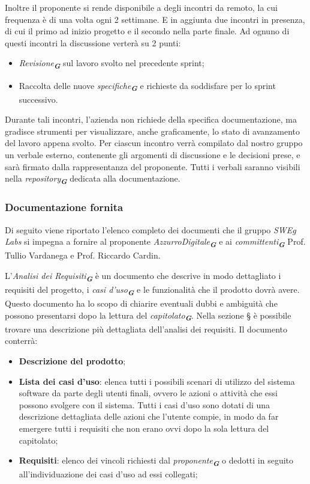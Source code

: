 Inoltre il proponente si rende disponibile a degli incontri da remoto, la cui frequenza è di una volta ogni 2 settimane.
E in aggiunta due incontri in presenza, di cui il primo ad inizio progetto e il secondo nella parte finale.
Ad ognuno di questi incontri la discussione verterà su 2 punti:
\begin{itemize}
    \item \emph{Revisione}\textsubscript{\textit{\textbf{G}}} sul lavoro svolto nel precedente sprint;
    \item Raccolta delle nuove \emph{specifiche}\textsubscript{\textit{\textbf{G}}} e richieste da soddisfare per lo sprint successivo.
\end{itemize}
Durante tali incontri, l’azienda non richiede della specifica documentazione, ma gradisce strumenti per visualizzare, anche graficamente, lo stato di avanzamento del lavoro appena svolto.
Per ciascun incontro verrà compilato dal nostro gruppo un verbale esterno, contenente gli argomenti di discussione e le decisioni prese, e sarà firmato dalla rappresentanza del proponente.
Tutti i verbali saranno visibili nella \emph{repository}\textsubscript{\textit{\textbf{G}}} dedicata alla documentazione.

\subsubsection{Documentazione fornita}
\label{sec:documentazione_fornita}
Di seguito viene riportato l'elenco completo dei documenti che il gruppo \emph{SWEg Labs} si impegna a fornire al proponente \emph{AzzurroDigitale}\textsubscript{\textit{\textbf{G}}}
e ai \emph{committenti}\textsubscript{\textit{\textbf{G}}} Prof. Tullio Vardanega e Prof. Riccardo Cardin.

L'\emph{Analisi dei Requisiti}\textsubscript{\textit{\textbf{G}}} è un documento che descrive in modo dettagliato i requisiti del progetto, i \emph{casi d'uso}\textsubscript{\textit{\textbf{G}}} e le funzionalità che il prodotto dovrà avere. 
Questo documento ha lo scopo di chiarire eventuali dubbi e ambiguità che possono presentarsi dopo la lettura del \emph{capitolato}\textsubscript{\textit{\textbf{G}}}.
Nella sezione \S{} è possibile trovare una descrizione più dettagliata dell'analisi dei requisiti.
Il documento conterrà:
\begin{itemize}
    \item \textbf{Descrizione del prodotto};
    \item \textbf{Lista dei casi d'uso}: elenca tutti i possibili scenari di utilizzo del sistema software
    da parte degli utenti finali, ovvero le azioni o attività che essi possono svolgere con il
    sistema. Tutti i casi d’uso sono dotati di una descrizione dettagliata delle azioni che
    l’utente compie, in modo da far emergere tutti i requisiti che non erano ovvi dopo la
    sola lettura del capitolato;
    \item \textbf{Requisiti}: elenco dei vincoli richiesti dal \emph{proponente}\textsubscript{\textit{\textbf{G}}} o dedotti in seguito all'individuazione dei casi d'uso ad essi collegati;
\end{itemize}

